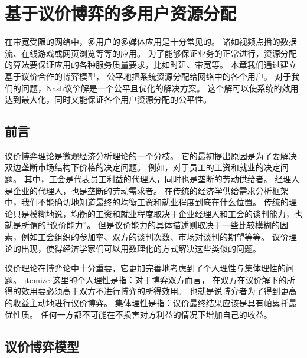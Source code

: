 \chapter{基于议价博弈的多用户资源分配}
\label{chap_nash_bargain}
在带宽受限的网络中，多用户的多媒体应用是十分常见的。
诸如视频点播的数据流、在线游戏或网页浏览等等的应用。
为了能够保证业务的正常进行，资源分配的算法要保证应用的各种服务质量要求，比如时延、带宽等。
本章我们通过建立基于议价合作的博弈模型，
公平地把系统资源分配给网络中的各个用户。
对于我们的问题，Nash议价解是一个公平且优化的解决方案。
这个解可以使系统的效用达到最大化，同时又能保证各个用户资源分配的公平性。

\section{前言}
议价博弈理论是微观经济分析理论的一个分枝。
它的最初提出原因是为了要解决双边垄断市场结构下价格的决定问题。
例如，对于员工的工资和就业的决定问题。
其中，工会是代表员工利益的代理人，同时也是垄断的劳动供给者。
经理人是企业的代理人，也是垄断的劳动需求者。
在传统的经济学供给需求分析框架中，我们不能确切地知道最终的均衡工资和就业程度到底在什么位置。
传统的理论只是模糊地说，均衡的工资和就业程度取决于企业经理人和工会的谈判能力，也就是所谓的“议价能力”。
但是议价能力的具体描述则取决于一些比较模糊的因素，例如工会组织的参加率、双方的谈判次数、市场对谈判的期望等等。
议价理论的出现，使得经济学家们可以用数理化的方式解决这些类似的问题。

议价理论在博弈论中十分重要，它更加完善地考虑到了个人理性与集体理性的问题。
itemize
这里的个人理性是指：对于博弈双方而言，
在双方在议价解下的所得的效用要必须高于双方不进行博弈的所得效用。
也就是说博弈者为了得到更高的收益主动地进行议价博弈。
集体理性是指：议价最终结果应该是具有帕累托最优性质。
任何一方都不可能在不损害对方利益的情况下增加自己的收益。

\section{议价博弈模型}


